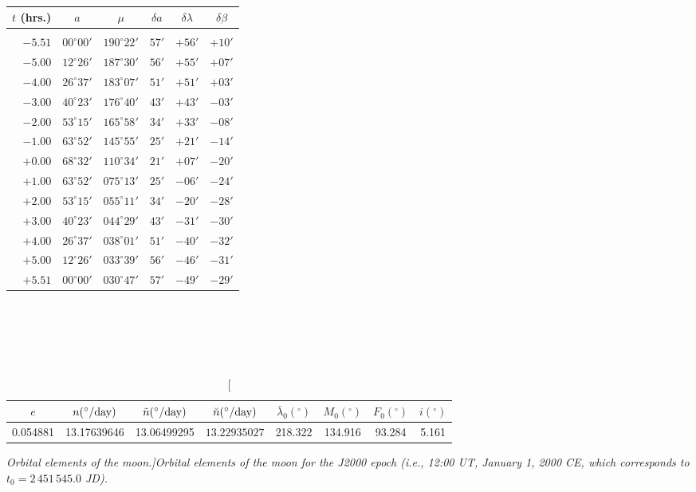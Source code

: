 ~\\
\begin{tabular}{r|ccccc}\centering
$t$ (hrs.) & $a $ & $\mu$ & $\delta a $ & $\delta\lambda $ & $\delta\beta$\\\hline
&&&\\[-1.75ex]
$-5.51$ & $00^\circ 00'$  & $190^\circ 22'$ & $57'$ &$+56'$ & $+10'$\\
$-5.00$ & $12^\circ 26'$ & $187^\circ 30'$ & $56'$ & $+55'$ & $+07'$\\
$-4.00$ & $26^\circ  37'$ & $183^\circ 07'$ & $51'$ & $+51'$&$+03'$\\
$-3.00$ & $40^\circ 23'$ & $176^\circ 40'$ & $43'$ &$+43'$ & $-03'$\\
$-2.00$ & $53^\circ 15'$ & $165^\circ 58'$ & $34'$ & $+33'$&$-08'$\\
$-1.00$ & $63^\circ 52'$ & $145^\circ 55'$ & $25'$ & $+21'$&$-14'$\\
$+0.00$ & $68^\circ 32'$ & $110^\circ 34'$ & $21'$ & $+07'$ & $-20'$\\
$+1.00$ & $63^\circ 52'$ & $075^\circ 13'$ & $25'$ & $-06'$&$-24'$\\
$+2.00$ & $53^\circ 15'$ & $055^\circ 11'$ & $34'$ & $-20'$&$-28'$\\
$+3.00$ & $40^\circ 23'$ & $044^\circ 29'$ & $43'$ & $-31'$&$-30'$\\
$+4.00$ & $26^\circ 37'$ & $038^\circ01'$ & $51'$ & $-40'$&$-32'$\\
$+5.00$& $12^\circ 26'$ & $033^\circ 39'$ & $56'$ & $- 46'$&$-31'$\\
$+5.51$ & $00^\circ 00'$ & $030^\circ 47'$ & $57'$ & $-49'$&$-29'$\\
\end{tabular}\\
~\\~\\~\\

\newpage
\begin{table}[h]
\begin{tabular}{cccccccc}
$e$ & $n(^\circ/{\rm day})$ &  $\tilde{n}(^\circ/{\rm day})$  & $\breve{n}(^\circ/{\rm day})$
& $ \bar{\lambda}_0(^\circ)$ & $M_0(^\circ)$ & $ F_0(^\circ)$ & $i(^\circ)$ \\\hline
0.054881 & 13.17639646 & 13.06499295& $13.22935027$ &
218.322 & 134.916 & 93.284& 5.161\\
\end{tabular}
\caption[\em Orbital elements of the moon.]{\em Orbital elements of the moon for the J2000 epoch ({\em i.e.}, 12:00 UT, January 1, 2000 CE,
which corresponds to $t_0 = 2\,451\,545.0$ JD).}\label{tmoon}
\end{table}


